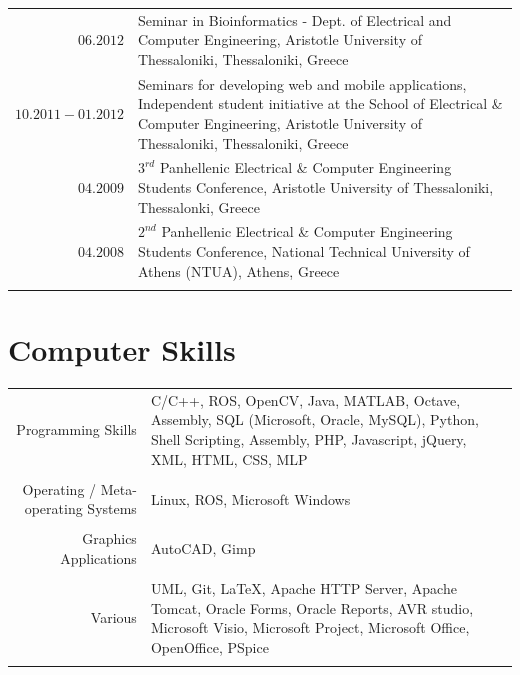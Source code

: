 \documentclass[a4paper,10pt,twoside]{article}
\begin{document}
\begin{tabular}{rp{12cm}}
$06.2012$ & Seminar in Bioinformatics -
Dept. of Electrical and Computer Engineering, Aristotle University of Thessaloniki, Thessaloniki, Greece \\

$10.2011 - 01.2012$ & Seminars for developing web and mobile applications,
Independent student initiative at the School of Electrical \& Computer Engineering, Aristotle
University of Thessaloniki, Thessaloniki, Greece \\

$04.2009$ & $3^{rd}$ Panhellenic Electrical \& Computer Engineering Students Conference,
Aristotle University of Thessaloniki, Thessalonki, Greece \\

$04.2008$ & $2^{nd}$ Panhellenic Electrical \& Computer Engineering Students Conference,
National Technical University of Athens (NTUA), Athens, Greece \\

&\\
\end{tabular}





\section{Computer Skills}

\begin{tabular}{rp{9cm}}
Programming Skills & C/C++, ROS, OpenCV, Java, MATLAB, Octave, Assembly, SQL (Microsoft, Oracle, MySQL), Python, Shell Scripting, Assembly, PHP, Javascript, jQuery, XML, HTML, CSS, MLP \\
\multicolumn{2}{c}{} \\


Operating / Meta-operating Systems & Linux, ROS, Microsoft Windows\\
\multicolumn{2}{c}{} \\


Graphics Applications & AutoCAD, Gimp\\
\multicolumn{2}{c}{} \\


Various & UML, Git, \LaTeX, Apache HTTP Server, Apache Tomcat, Oracle Forms, Oracle Reports, AVR studio, Microsoft Visio, Microsoft Project, Microsoft Office, OpenOffice, PSpice \\
\multicolumn{2}{c}{} \\
\end{tabular}
\end{document}
